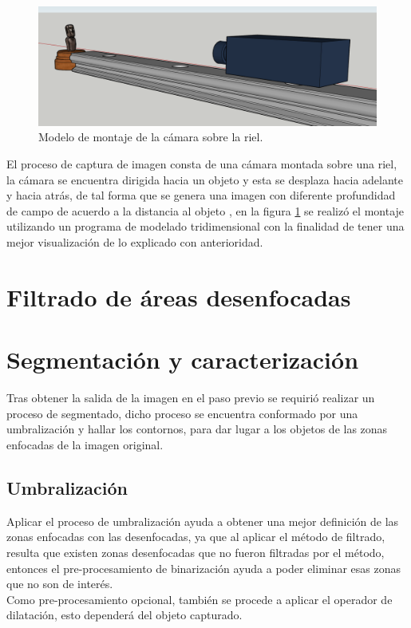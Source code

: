 \begin{figure}
\centering
\includegraphics[scale=0.30]{GraficosMetodologia/CapturaDeImagen.png} 
\caption{Modelo de montaje de la cámara sobre la riel.}
\label{modelCapturaImagen}
\end{figure}
El proceso de captura de imagen consta de una cámara montada sobre una riel, la cámara se encuentra dirigida hacia un objeto y esta se desplaza hacia adelante y hacia atrás, de tal forma que se genera una imagen con diferente profundidad de campo de acuerdo a la distancia al objeto \citet{Zhang:14}, en la figura \ref{modelCapturaImagen} se realizó el montaje utilizando un programa de modelado tridimensional con la finalidad de tener una mejor visualización de lo explicado con anterioridad.


\section{Filtrado de áreas desenfocadas}



\section{Segmentación y caracterización}
Tras obtener la salida de la imagen en el paso previo se requirió realizar un proceso de segmentado, dicho proceso se encuentra conformado por una umbralización y hallar los contornos, para dar lugar a los objetos de las zonas enfocadas de la imagen original.
\subsection{Umbralización}
Aplicar el proceso de umbralización ayuda a obtener una mejor definición de las zonas enfocadas con las desenfocadas, ya que al aplicar el método de filtrado, resulta que existen zonas desenfocadas que no fueron filtradas por el método, entonces el pre-procesamiento de binarización ayuda a poder eliminar esas zonas que no son de interés.\\
Como pre-procesamiento opcional, también se procede a aplicar el operador de dilatación, esto dependerá del objeto capturado.

